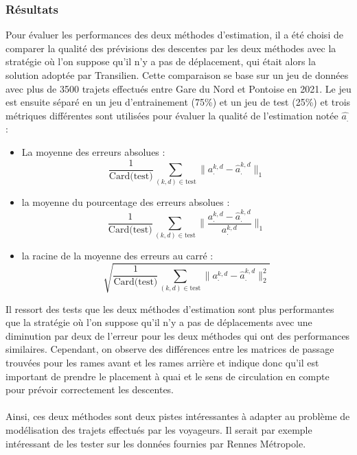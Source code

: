 \documentclass[12pt]{article}
\begin{document}
\subsubsection{Résultats}
Pour évaluer les performances des deux méthodes d'estimation, il a été choisi de comparer la qualité des prévisions des descentes par les deux méthodes avec la stratégie où l'on suppose qu'il n'y a pas de déplacement, qui était alors la solution adoptée par Transilien. Cette comparaison se base sur un jeu de données avec plus de 3500 trajets effectués entre Gare du Nord et Pontoise en 2021. Le jeu est ensuite séparé en un jeu d'entrainement (75\%) et un jeu de test (25\%) et trois métriques différentes sont utilisées pour évaluer la qualité de l'estimation notée $\hat{a_.}$ : 
\begin{itemize}
    \item La moyenne des erreurs absolues :\[
    \frac{1}{\text{Card(test)}}\sum_{(k,d)\in \text{test}}\lVert a_{.}^{k,d} - \hat{a}_{.}^{k,d}\lVert_1\]
    \item la moyenne du pourcentage des erreurs absolues :\[
    \frac{1}{\text{Card(test)}}\sum_{(k,d)\in \text{test}}\lVert \frac{a_{.}^{k,d} - \hat{a}_{.}^{k,d}}{a_{.}^{k,d}} \lVert_1
    \]
    \item la racine de la moyenne des erreurs au carré :\[
    \sqrt{
    \frac{1}{\text{Card(test)}}\sum_{(k,d)\in \text{test}}\lVert a_{.}^{k,d} - \hat{a}_{.}^{k,d}\lVert^2_2}
    \] 
\end{itemize}
Il ressort des tests que les deux méthodes d'estimation sont plus performantes que la stratégie où l'on suppose qu'il n'y a pas de déplacements avec une diminution par deux de l'erreur pour les deux méthodes qui ont des performances similaires. Cependant, on observe des différences entre les matrices de passage trouvées pour les rames avant et les rames arrière et \cite{these_remi_coulaud} indique donc qu'il est important de prendre le placement à quai et le sens de circulation en compte pour prévoir correctement les descentes.\\
\\
Ainsi, ces deux méthodes sont deux pistes intéressantes à adapter au problème de modélisation des trajets effectués par les voyageurs. Il serait par exemple intéressant de les tester sur les données fournies par Rennes Métropole.
\end{document}
